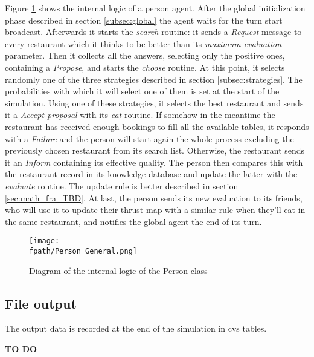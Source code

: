 \documentclass[10pt,a4paper]{article}
\newcommand{\fpath}{./Figs/}
\begin{document}
Figure \ref{fig:person_flow} shows the internal logic of a person agent. After the global initialization phase described in section \ref{subsec:global} the agent waits for the turn start broadcast. Afterwards it starts the \textit{search} routine: it sends a \textit{Request} message to every restaurant which it thinks to be better than its \textit{maximum evaluation} parameter. Then it collects all the answers, selecting only the positive ones, containing a \textit{Propose}, and starts the \textit{choose} routine. At this point, it selects randomly one of the three strategies described in section \ref{subsec:strategies}. The probabilities with which it will select one of them is set at the start of the simulation. Using one of these strategies, it selects the best restaurant and sends it a \textit{Accept proposal} with its \textit{eat} routine. If somehow in the meantime the restaurant has received enough bookings to fill all the available tables, it responds with a \textit{Failure} and the person will start again the whole process excluding the previously chosen restaurant from its search list. Otherwise, the restaurant sends it an \textit{Inform} containing its effective quality. The person then compares this with the restaurant record in its knowledge database and update the latter with the \textit{evaluate} routine. The update rule is better described in section \ref{sec:math_fra_TBD}. At last, the person sends its new evaluation to its friends, who will use it to update their thrust map with a similar rule when they'll eat in the same restaurant, and notifies the global agent the end of its turn.
\begin{figure}
\texttt{[image: \\fpath/Person\_General.png]}
\caption{Diagram of the internal logic of the Person class}
\label{fig:person_flow}
\end{figure}

\subsection{File output}
The output data is recorded at the end of the simulation in cvs tables. 

\textbf{TO DO}
\end{document}
